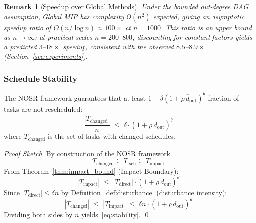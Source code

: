 \documentclass[manuscript,screen,review]{acmart}
\newtheorem{remark}{Remark}
\begin{document}
\begin{remark}[Speedup over Global Methods]
\label{rem:speedup}
Under the bounded out-degree DAG assumption, Global MIP has complexity
$O(n^2)$ expected, giving an asymptotic speedup ratio of
$O(n/\log n) \approx 100{\times}$ at $n{=}1000$.
This ratio is an upper bound as $n\to\infty$; at practical scales
$n=200$--$800$, discounting for constant factors yields a predicted
$3$--$18\times$ speedup, consistent with the observed $8.5$--$8.9\times$
(Section~\ref{sec:experiments}).
\end{remark}

\subsubsection{Schedule Stability}

\begin{theorem}
\label{thm:stability}
The NOSR framework guarantees that at least
$1 - \delta(1 + \rho\,\bar{d}_{\mathrm{out}})^\theta$ fraction of tasks
are not rescheduled:
\begin{equation}
    \frac{|T_{\mathrm{changed}}|}{n}
    \;\leq\;
    \delta \cdot (1 + \rho\,\bar{d}_{\mathrm{out}})^{\theta}
    \label{eq:stability}
\end{equation}
where $T_{\mathrm{changed}}$ is the set of tasks with changed schedules.
\end{theorem}

\begin{proof}[Proof Sketch]
By construction of the NOSR framework:
\begin{equation}
    T_{\mathrm{changed}} \subseteq T_{\mathrm{rsch}}
    \subseteq T_{\mathrm{impact}}
\end{equation}
From Theorem~\ref{thm:impact_bound} (Impact Boundary):
\begin{equation}
    |T_{\mathrm{impact}}| \;\leq\;
    |T_{\mathrm{direct}}| \cdot
    (1 + \rho\,\bar{d}_{\mathrm{out}})^{\theta}
\end{equation}
Since $|T_{\mathrm{direct}}| \leq \delta n$ by
Definition~\ref{def:disturbance} (disturbance intensity):
\begin{equation}
    |T_{\mathrm{changed}}| \;\leq\; |T_{\mathrm{impact}}|
    \;\leq\; \delta n \cdot
    (1 + \rho\,\bar{d}_{\mathrm{out}})^{\theta}
\end{equation}
Dividing both sides by $n$ yields~\eqref{eq:stability}. \qed
\end{proof}
\end{document}
